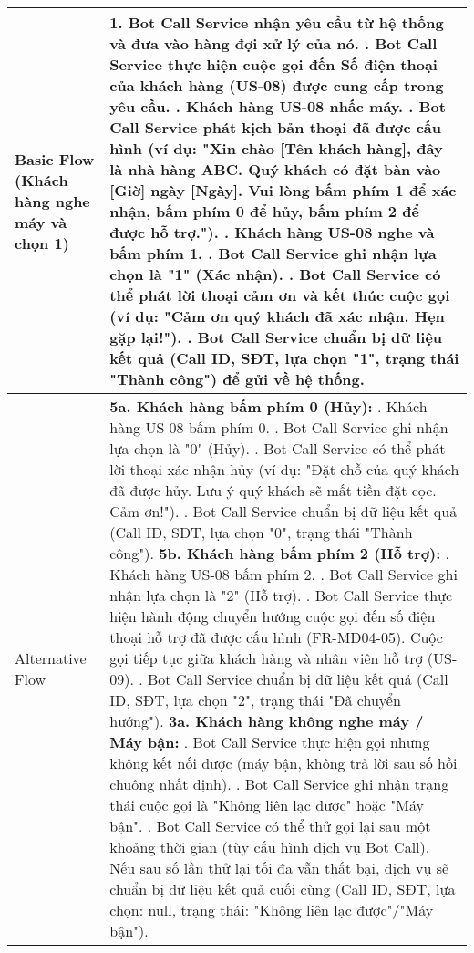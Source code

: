 \begin{longtable}{|m{4cm}|p{11cm}|}
Basic Flow (Khách hàng nghe máy và chọn 1) & 1. Bot Call Service nhận yêu cầu từ hệ thống và đưa vào hàng đợi xử lý của nó. \newline 2. Bot Call Service thực hiện cuộc gọi đến Số điện thoại của khách hàng (US-08) được cung cấp trong yêu cầu. \newline 3. Khách hàng US-08 nhấc máy. \newline 4. Bot Call Service phát kịch bản thoại đã được cấu hình (ví dụ: "Xin chào [Tên khách hàng], đây là nhà hàng ABC. Quý khách có đặt bàn vào [Giờ] ngày [Ngày]. Vui lòng bấm phím 1 để xác nhận, bấm phím 0 để hủy, bấm phím 2 để được hỗ trợ."). \newline 5. Khách hàng US-08 nghe và bấm phím 1. \newline 6. Bot Call Service ghi nhận lựa chọn là "1" (Xác nhận). \newline 7. Bot Call Service có thể phát lời thoại cảm ơn và kết thúc cuộc gọi (ví dụ: "Cảm ơn quý khách đã xác nhận. Hẹn gặp lại!"). \newline 8. Bot Call Service chuẩn bị dữ liệu kết quả (Call ID, SĐT, lựa chọn "1", trạng thái "Thành công") để gửi về hệ thống. \\
\hline
Alternative Flow & \textbf{5a. Khách hàng bấm phím 0 (Hủy):} \newline    1. Khách hàng US-08 bấm phím 0. \newline    2. Bot Call Service ghi nhận lựa chọn là "0" (Hủy). \newline    3. Bot Call Service có thể phát lời thoại xác nhận hủy (ví dụ: "Đặt chỗ của quý khách đã được hủy. Lưu ý quý khách sẽ mất tiền đặt cọc. Cảm ơn!"). \newline    4. Bot Call Service chuẩn bị dữ liệu kết quả (Call ID, SĐT, lựa chọn "0", trạng thái "Thành công"). \newline \textbf{5b. Khách hàng bấm phím 2 (Hỗ trợ):} \newline    1. Khách hàng US-08 bấm phím 2. \newline    2. Bot Call Service ghi nhận lựa chọn là "2" (Hỗ trợ). \newline    3. Bot Call Service thực hiện hành động chuyển hướng cuộc gọi đến số điện thoại hỗ trợ đã được cấu hình (FR-MD04-05). Cuộc gọi tiếp tục giữa khách hàng và nhân viên hỗ trợ (US-09). \newline    4. Bot Call Service chuẩn bị dữ liệu kết quả (Call ID, SĐT, lựa chọn "2", trạng thái "Đã chuyển hướng"). \newline \textbf{3a. Khách hàng không nghe máy / Máy bận:} \newline    1. Bot Call Service thực hiện gọi nhưng không kết nối được (máy bận, không trả lời sau số hồi chuông nhất định). \newline    2. Bot Call Service ghi nhận trạng thái cuộc gọi là "Không liên lạc được" hoặc "Máy bận". \newline    3. Bot Call Service có thể thử gọi lại sau một khoảng thời gian (tùy cấu hình dịch vụ Bot Call). Nếu sau số lần thử lại tối đa vẫn thất bại, dịch vụ sẽ chuẩn bị dữ liệu kết quả cuối cùng (Call ID, SĐT, lựa chọn: null, trạng thái: "Không liên lạc được"/"Máy bận"). \\

\end{longtable}
